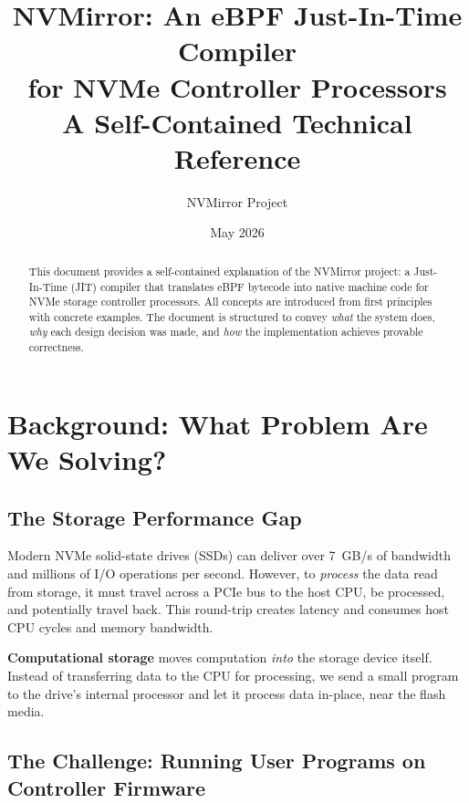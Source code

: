 \documentclass[11pt,letterpaper]{article}
\title{\textbf{NVMirror: An eBPF Just-In-Time Compiler\\for NVMe Controller Processors}\\[0.5em]
\large A Self-Contained Technical Reference}
\author{NVMirror Project}
\date{May 2026}
\begin{document}
\maketitle

\begin{abstract}
This document provides a self-contained explanation of the NVMirror project: a Just-In-Time (JIT) compiler that translates eBPF bytecode into native machine code for NVMe storage controller processors. All concepts are introduced from first principles with concrete examples. The document is structured to convey \emph{what} the system does, \emph{why} each design decision was made, and \emph{how} the implementation achieves provable correctness.
\end{abstract}

\tableofcontents
\newpage

\section{Background: What Problem Are We Solving?}

\subsection{The Storage Performance Gap}

Modern NVMe solid-state drives (SSDs) can deliver over 7~GB/s of bandwidth and millions of I/O operations per second. However, to \emph{process} the data read from storage, it must travel across a PCIe bus to the host CPU, be processed, and potentially travel back. This round-trip creates latency and consumes host CPU cycles and memory bandwidth.

\begin{keyinsight}
\textbf{Computational storage} moves computation \emph{into} the storage device itself. Instead of transferring data to the CPU for processing, we send a small program to the drive's internal processor and let it process data in-place, near the flash media.
\end{keyinsight}

\subsection{The Challenge: Running User Programs on Controller Firmware}
\end{document}
